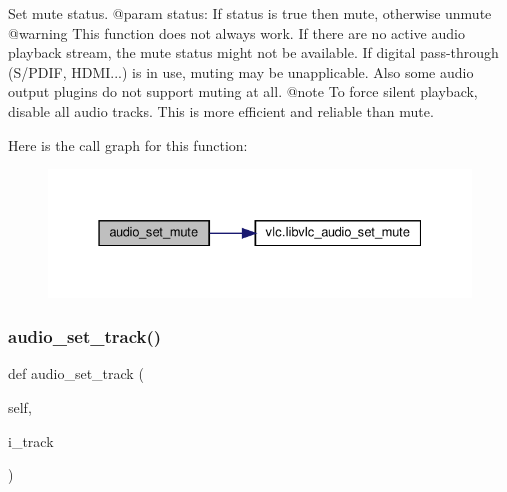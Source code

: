 \begin{DoxyVerb}Set mute status.
@param status: If status is true then mute, otherwise unmute @warning This function does not always work. If there are no active audio playback stream, the mute status might not be available. If digital pass-through (S/PDIF, HDMI...) is in use, muting may be unapplicable. Also some audio output plugins do not support muting at all. @note To force silent playback, disable all audio tracks. This is more efficient and reliable than mute.
\end{DoxyVerb}
 Here is the call graph for this function\+:
\nopagebreak
\begin{figure}[H]
\begin{center}
\leavevmode
\includegraphics[width=331pt]{classvlc_1_1_media_player_a0eb67e5d4feba97af9ed0e7b2514a9a2_cgraph}
\end{center}
\end{figure}
\mbox{\label{classvlc_1_1_media_player_a705fbd168baaefb6ee78d814090a7919}} 
\subsubsection{\texorpdfstring{audio\+\_\+set\+\_\+track()}{audio\_set\_track()}}
{\footnotesize\ttfamily def audio\+\_\+set\+\_\+track (\begin{DoxyParamCaption}\item[{}]{self,  }\item[{}]{i\+\_\+track }\end{DoxyParamCaption})}

